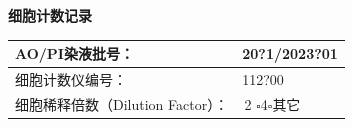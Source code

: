 \documentclass[UTF8,10pt,a4paper,fontset=fandol]{ctexart}
\newcommand{\fieldvalue}[1]{#1}
\newcommand{\handwritten}[1]{#1}
\let\mathcheckmark\checkmark
\renewcommand{\checkmark}{\ensuremath{\mathcheckmark}}
\begin{document}
\vspace{5mm}

\begin{center}
\textbf{细胞计数记录}
\end{center}

\begin{tabularx}{\textwidth}{p{}|X}
\hline
AO/PI染液批号：&
\fieldvalue{\handwritten{20?1/2023?01}}\\
\hline
细胞计数仪编号：&
\fieldvalue{\handwritten{112?00}}\\
\hline
细胞稀释倍数（Dilution Factor）：&
\fieldvalue{%
\raisebox{0.1ex}{\(\checkmark\)}\,2
}\quad
$\square$4\quad $\square$其它\\
\hline
\end{tabularx}
\end{document}
